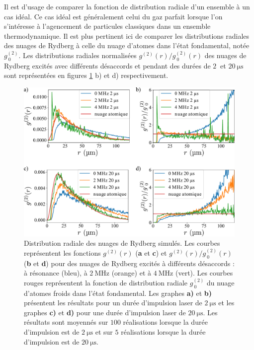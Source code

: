 Il est d'usage de comparer la fonction de distribution radiale d'un ensemble à un cas idéal.
Ce cas idéal est généralement celui du gaz parfait lorsque l'on s'intéresse à l'agencement de particules classiques dans un ensemble thermodynamique.
Il est plus pertinent ici de comparer les distributions radiales des nuages de Rydberg à celle du nuage d'atomes dans l'état fondamental, notée $g^{(2)}_{~0}$.
Les distributions radiales normalisées $g^{(2)}(r)/g^{(2)}_{~0}(r)$ des nuages de Rydberg excités avec différents désaccords et pendant des durées de $\SI{2}{}$ et $\SI{20}{\us}$ sont représentées en figures \ref{fig:spatial_distrib_sim} b) et d) respectivement.
%
\begin{figure}[h]
\centering
\includegraphics[width=\linewidth]{figures/low_l/g2r_all}
\caption[Distribution radiale des nuages de Rydberg simulés]{
Distribution radiale des nuages de Rydberg simulés.
Les courbes représentent les fonctions $g^{(2)}(r)$ (\textbf{a} et \textbf{c}) et $g^{(2)}(r)/g^{(2)}_{~0}(r)$ (\textbf{b} et \textbf{d}) pour des nuages de Rydberg excités à différents désaccords : à résonance (bleu), à $\SI{2}{\MHz}$ (orange) et à $\SI{4}{\MHz}$ (vert).
Les courbes rouges représentent la fonction de distribution radiale $g^{(2)}_{~0}$ du nuage d'atomes froids dans l'état fondamental.
Les graphes \textbf{a)} et \textbf{b)} présentent les résultats pour un durée d'impulsion laser de $\SI{2}{\us}$ et les graphes \textbf{c)} et \textbf{d)} pour une durée d'impulsion laser de $\SI{20}{\us}$.
Les résultats sont moyennés sur $100$ réalisations lorsque la durée d'impulsion est de $\SI{2}{\us}$ et sur $5$ réalisations lorsque la durée d'impulsion est de $\SI{20}{\us}$.
}
\label{fig:spatial_distrib_sim}
\end{figure}
%
%

